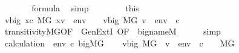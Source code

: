 \begin{isabellebody}
\ {\isacartoucheopen}{\isasymphi}{\isasymin}{\isacharunderscore}{\kern0pt}{\isacartoucheclose}\isanewline
\ \ \ \ \isamarkupfalse%
\ {\isachardoublequoteopen}{\isacharquery}{\kern0pt}{\isasympsi}{\isasymin}formula{\isachardoublequoteclose}\ \isamarkupfalse%
\ simp\isanewline
\ \ \isamarkupfalse%
\isanewline
\ \ \isamarkupfalse%
\ \isamarkupfalse%
\ this\isanewline
\ \ \isamarkupfalse%
\ {\isachardoublequoteopen}{\isacharbraceleft}{\kern0pt}v{\isasymin}{\isacharquery}{\kern0pt}big{\isachardot}{\kern0pt}\ {\isasymexists}x{\isasymin}c{\isachardot}{\kern0pt}\ M{\isacharbrackleft}{\kern0pt}G{\isacharbrackright}{\kern0pt}{\isacharcomma}{\kern0pt}\ {\isacharbrackleft}{\kern0pt}x{\isacharcomma}{\kern0pt}v{\isacharbrackright}{\kern0pt}\ {\isacharat}{\kern0pt}\ env\ {\isasymTurnstile}\ {\isasymphi}{\isacharbraceright}{\kern0pt}\ {\isacharequal}{\kern0pt}\ {\isacharbraceleft}{\kern0pt}v{\isasymin}{\isacharquery}{\kern0pt}big{\isachardot}{\kern0pt}\ M{\isacharbrackleft}{\kern0pt}G{\isacharbrackright}{\kern0pt}{\isacharcomma}{\kern0pt}\ {\isacharbrackleft}{\kern0pt}v{\isacharbrackright}{\kern0pt}\ {\isacharat}{\kern0pt}\ env\ {\isacharat}{\kern0pt}\ {\isacharbrackleft}{\kern0pt}c{\isacharbrackright}{\kern0pt}\ {\isasymTurnstile}\ \ {\isacharquery}{\kern0pt}{\isasympsi}{\isacharbraceright}{\kern0pt}{\isachardoublequoteclose}\isanewline
\ \ \ \ \isamarkupfalse%
\ transitivity{\isacharunderscore}{\kern0pt}MG{\isacharbrackleft}{\kern0pt}OF\ {\isacharunderscore}{\kern0pt}\ GenExtI{\isacharcomma}{\kern0pt}\ OF\ {\isacharunderscore}{\kern0pt}\ {\isacartoucheopen}{\isacharquery}{\kern0pt}big{\isacharunderscore}{\kern0pt}name{\isasymin}M{\isacartoucheclose}{\isacharbrackright}{\kern0pt}\isanewline
\ \ \ \ \isamarkupfalse%
\ simp\isanewline
\ \ \isamarkupfalse%
\ \isamarkupfalse%
\ calculation\ \ {\isacartoucheopen}env{\isasymin}{\isacharunderscore}{\kern0pt}{\isacartoucheclose}\ {\isacartoucheopen}c{\isasymin}{\isacharunderscore}{\kern0pt}{\isacartoucheclose}\ {\isacartoucheopen}{\isacharquery}{\kern0pt}big{\isasymin}M{\isacharbrackleft}{\kern0pt}G{\isacharbrackright}{\kern0pt}{\isacartoucheclose}\isanewline
\ \ \isamarkupfalse%
\ {\isachardoublequoteopen}{\isacharbraceleft}{\kern0pt}v{\isasymin}{\isacharquery}{\kern0pt}big{\isachardot}{\kern0pt}\ M{\isacharbrackleft}{\kern0pt}G{\isacharbrackright}{\kern0pt}\ {\isacharcomma}{\kern0pt}\ {\isacharbrackleft}{\kern0pt}v{\isacharbrackright}{\kern0pt}\ {\isacharat}{\kern0pt}\ env\ {\isacharat}{\kern0pt}\ {\isacharbrackleft}{\kern0pt}c{\isacharbrackright}{\kern0pt}\ {\isasymTurnstile}\ {\isacharquery}{\kern0pt}{\isasympsi}{\isacharbraceright}{\kern0pt}\ {\isasymin}\ M{\isacharbrackleft}{\kern0pt}G{\isacharbrackright}{\kern0pt}{\isachardoublequoteclose}\isanewline

\end{isabellebody}
